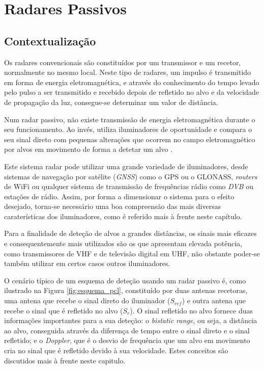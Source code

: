 
\chapter{Radares Passivos} %

\label{chap:Chapter2} %


\section{Contextualização} \label{contextualização}
Os radares convencionais são constituídos por um transmissor e um recetor, normalmente no mesmo local. Neste tipo de radares, um impulso é transmitido em forma de energia eletromagnética, e através do conhecimento do tempo levado pelo pulso a ser transmitido e recebido depois de refletido no alvo e da velocidade de propagação da luz, consegue-se determinar um valor de distância.\par 
Num radar passivo, não existe transmissão de energia eletromagnética durante o seu funcionamento. Ao invés, utiliza iluminadores de oportunidade e compara o seu sinal direto com pequenas alterações que ocorrem no campo eletromagnético por alvos em movimento de forma a detetar um alvo \parencite{Griffiths2017}.\par 
Este sistema radar pode utilizar uma grande variedade de iluminadores, desde sistemas de navegação por satélite (\textit{\gls{GNSS}}) como o \gls{GPS} ou o GLONASS, \textit{routers} de WiFi ou qualquer sistema de transmissão de frequências rádio como \textit{\gls{DVB}} ou estações de rádio. Assim, por forma a dimensionar o sistema para o efeito desejado, torna-se necessário uma boa compreensão das mais diversas caraterísticas dos iluminadores, como é referido mais à frente neste capítulo.\par 
Para a finalidade de deteção de alvos a grandes distâncias, os sinais mais eficazes e consequentemente mais utilizados são os que apresentam elevada potência, como transmissores de \gls{VHF} e de televisão digital em \gls{UHF}, não obstante poder-se também utilizar em certos casos outros iluminadores.\par
O cenário típico de um esquema de deteção usando um radar passivo é, como ilustrado na Figura \ref{fig:esquema_pcl}, constituído por duas antenas recetoras, uma antena que recebe o sinal direto do iluminador ($S_{ref}$) e outra antena que recebe o sinal que é refletido no alvo ($S_{r}$). O sinal refletido no alvo fornece duas informações importantes para a sua deteção: o \textit{bistatic range}, ou seja, a distância ao alvo, conseguida através da diferença de tempo entre o sinal direto e o sinal refletido; e o \textit{Doppler}, que é o desvio de frequência que um alvo em movimento cria no sinal que é refletido devido à sua velocidade. Estes conceitos são discutidos mais à frente neste capitulo. \par

